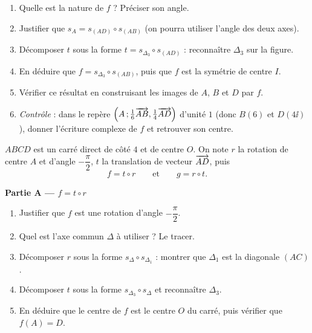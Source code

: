\begin{enumerate}
	\item Quelle est la nature de $f$ ? Préciser son angle.
	\item Justifier que $s_A=s_{(AD)}\circ s_{(AB)}$ (on pourra utiliser
	l'angle des deux axes).
	\item Décomposer $t$ sous la forme $t=s_{\Delta_3}\circ s_{(AD)}$ :
	reconnaître $\Delta_3$ sur la figure.
	\item En déduire que $f=s_{\Delta_3}\circ s_{(AB)}$, puis que $f$ est la
	symétrie de centre $I$.
	\item Vérifier ce résultat en construisant les images de $A$, $B$ et $D$
	par $f$.
	\item \emph{Contrôle} : dans le repère
	$\left(A\,;\frac16\overrightarrow{AB},\frac14\overrightarrow{AD}\right)$ d'unité $1$
	(donc $B(6)$ et $D(4\ii)$), donner l'écriture complexe de $f$ et
	retrouver son centre.
\end{enumerate}

$ABCD$ est un carré direct de côté $4$ et de centre $O$. On note $r$ la
rotation de centre $A$ et d'angle $-\dfrac{\pi}{2}$, $t$ la translation de
vecteur $\overrightarrow{AD}$, puis
$$
f=t\circ r \qquad\text{et}\qquad g=r\circ t .
$$

\begin{center}
\end{center}

\textbf{Partie A — $f=t\circ r$}
\begin{enumerate}
	\item Justifier que $f$ est une rotation d'angle $-\dfrac{\pi}{2}$.
	\item Quel est l'axe commun $\Delta$ à utiliser ? Le tracer.
	\item Décomposer $r$ sous la forme $s_{\Delta}\circ s_{\Delta_1}$ :
	montrer que $\Delta_1$ est la diagonale $(AC)$.
	\item Décomposer $t$ sous la forme $s_{\Delta_3}\circ s_{\Delta}$ et
	reconnaître $\Delta_3$.
	\item En déduire que le centre de $f$ est le centre $O$ du carré, puis
	vérifier que $f(A)=D$.
\end{enumerate}

